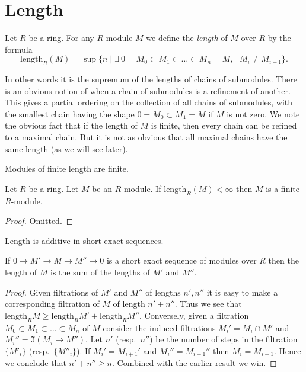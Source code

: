 \section{Length}
\label{section-length}

\begin{definition}
\label{definition-length}
Let $R$ be a ring. For any $R$-module $M$
we define the {\it length} of $M$ over $R$ by the
formula
$$
\text{length}_R(M)
=
\sup
\{
n
\mid
\exists\ 0 = M_0 \subset M_1 \subset \ldots \subset M_n = M,
\text{ }M_i \not = M_{i + 1}
\}.
$$
\end{definition}

\noindent
In other words it is the supremum of the lengths of chains
of submodules. There is an obvious notion of when a chain
of submodules is a refinement of another. This gives a
partial ordering on the collection of all chains of submodules,
with the smallest chain having the shape $0 = M_0 \subset M_1 = M$
if $M$ is not zero.
We note the obvious fact that if the length of
$M$ is finite, then every chain can be refined to a
maximal chain. But it is not as obvious that all maximal
chains have the same length (as we will see later).

\begin{lemma}
\label{lemma-finite-length-finite}
\begin{slogan}
Modules of finite length are finite.
\end{slogan}
Let $R$ be a ring.
Let $M$ be an $R$-module.
If $\text{length}_R(M) < \infty$ then $M$ is a finite $R$-module.
\end{lemma}

\begin{proof}
Omitted.
\end{proof}

\begin{lemma}
\label{lemma-length-additive}
\begin{slogan}
Length is additive in short exact sequences.
\end{slogan}
If $0 \to M' \to M \to M'' \to 0$
is a short exact sequence of modules over $R$ then
the length of $M$ is the sum of the
lengths of $M'$ and $M''$.
\end{lemma}

\begin{proof}
Given filtrations of $M'$ and $M''$ of lengths $n', n''$
it is easy to make a corresponding filtration of $M$
of length $n' + n''$. Thus we see that $\text{length}_R M
\geq \text{length}_R M' + \text{length}_R M''$.
Conversely, given a filtration
$M_0 \subset M_1 \subset \ldots \subset M_n$ of
$M$ consider the induced filtrations
$M_i' = M_i \cap M'$ and $M_i'' = \Im(M_i \to M'')$.
Let $n'$ (resp.\ $n''$) be the number of steps in the filtration
$\{M'_i\}$ (resp.\ $\{M''_i\}$).
If $M_i' = M_{i + 1}'$ and $M_i'' = M_{i + 1}''$ then
$M_i = M_{i + 1}$. Hence we conclude that $n' + n'' \geq n$.
Combined with the earlier result we win.
\end{proof}

